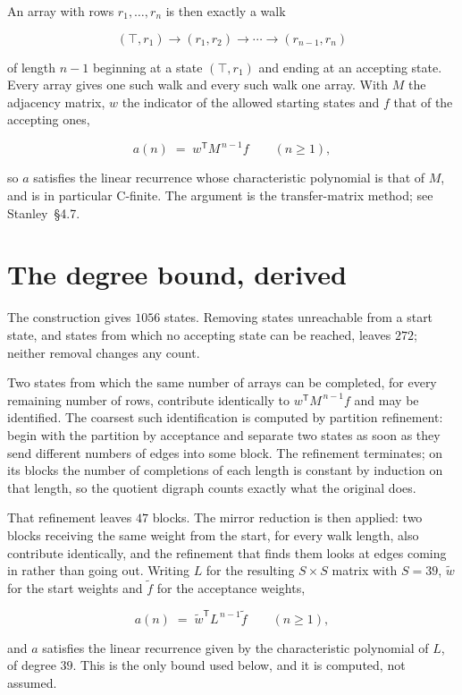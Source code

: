 \documentclass[11pt]{article}
\theoremstyle{definition}
\begin{document}
An array with rows $r_1,\dots,r_n$ is then exactly a walk

\[(\top,r_1) \to (r_1,r_2) \to \cdots \to (r_{n-1},r_n)\]

of length $n-1$ beginning at a state $(\top,r_1)$ and ending at an accepting state. Every array gives one such walk and every such walk one array. With $M$ the adjacency matrix, $w$ the indicator of the allowed starting states and $f$ that of the accepting ones,

\[a(n) \;=\; w^{\mathsf T} M^{\,n-1} f \qquad (n \ge 1),\]

so $a$ satisfies the linear recurrence whose characteristic polynomial is that of $M$, and is in particular C-finite. The argument is the transfer-matrix method; see Stanley~\S4.7.

\section{The degree bound, derived}

The construction gives $1056$ states. Removing states unreachable from a start state, and states from which no accepting state can be reached, leaves $272$; neither removal changes any count.

Two states from which the same number of arrays can be completed, for every remaining number of rows, contribute identically to $w^{\mathsf T}M^{\,n-1}f$ and may be identified. The coarsest such identification is computed by partition refinement: begin with the partition by acceptance and separate two states as soon as they send different numbers of edges into some block. The refinement terminates; on its blocks the number of completions of each length is constant by induction on that length, so the quotient digraph counts exactly what the original does.

That refinement leaves $47$ blocks. The mirror reduction is then applied: two blocks receiving the same weight from the start, for every walk length, also contribute identically, and the refinement that finds them looks at edges coming in rather than going out. Writing $L$ for the resulting $S \times S$ matrix with $S = 39$, $\tilde w$ for the start weights and $\tilde f$ for the acceptance weights,

\[a(n) \;=\; \tilde w^{\mathsf T} L^{\,n-1} \tilde f \qquad (n \ge 1),\]

and $a$ satisfies the linear recurrence given by the characteristic polynomial of $L$, of degree $39$. This is the only bound used below, and it is computed, not assumed.
\end{document}
